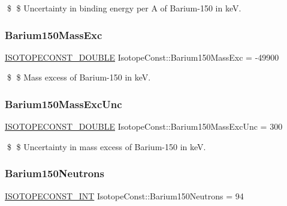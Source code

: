 \$ \$ Uncertainty in binding energy per A of Barium-\/150 in keV. \mbox{\label{group___isotope_const-_barium-_ba150_ga7f6b598bbb0e2bbdf39c6c592983c1cd}} 
\subsubsection{\texorpdfstring{Barium150\+Mass\+Exc}{Barium150MassExc}}
{\footnotesize\ttfamily \mbox{\hyperlink{group___isotope_const-_macros_ga8f45a7272ce02c0b4c65c44636ed719a}{I\+S\+O\+T\+O\+P\+E\+C\+O\+N\+S\+T\+\_\+\+D\+O\+U\+B\+LE}} Isotope\+Const\+::\+Barium150\+Mass\+Exc = -\/49900}

\$ \$ Mass excess of Barium-\/150 in keV. \mbox{\label{group___isotope_const-_barium-_ba150_gac40f0dede30233039a5debfda95a3a93}} 
\subsubsection{\texorpdfstring{Barium150\+Mass\+Exc\+Unc}{Barium150MassExcUnc}}
{\footnotesize\ttfamily \mbox{\hyperlink{group___isotope_const-_macros_ga8f45a7272ce02c0b4c65c44636ed719a}{I\+S\+O\+T\+O\+P\+E\+C\+O\+N\+S\+T\+\_\+\+D\+O\+U\+B\+LE}} Isotope\+Const\+::\+Barium150\+Mass\+Exc\+Unc = 300}

\$ \$ Uncertainty in mass excess of Barium-\/150 in keV. \mbox{\label{group___isotope_const-_barium-_ba150_ga57fd39e55f0e895be0c99a252e3342ff}} 
\subsubsection{\texorpdfstring{Barium150\+Neutrons}{Barium150Neutrons}}
{\footnotesize\ttfamily \mbox{\hyperlink{group___isotope_const-_macros_ga5f18360b3e99483a35c32d789e62621c}{I\+S\+O\+T\+O\+P\+E\+C\+O\+N\+S\+T\+\_\+\+I\+NT}} Isotope\+Const\+::\+Barium150\+Neutrons = 94}

